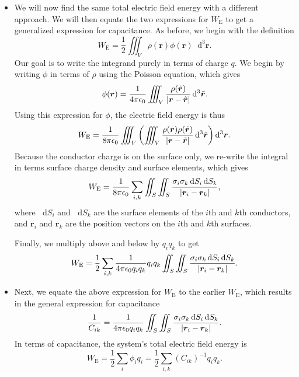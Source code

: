 \documentclass[11pt, a4paper]{article}
\newcommand{\diff}{\mathop{}\!\mathrm{d}} %
\newcommand{\dr}{\diff^{3} \r}  %
\newcommand{\dtr}{\diff^{3} \tilde{\r}}  %
\renewcommand{\vec}[1]{\bm{#1}} %
\renewcommand{\t}[1]{\tilde{#1}} %
\renewcommand{\r}{\vec{r}}
\newcommand{\ee}{\epsilon_{0}}  %
\begin{document}
\begin{itemize}
	\item We will now find the same total electric field energy with a different approach. We will then equate the two expressions for $ W_{\text{E}} $ to get a generalized expression for capacitance. As before, we begin with the definition
	\begin{equation*}
		W_{\text{E}} = \frac{1}{2}\iiint_{V} \rho(\r) \phi(\r) \dr.
	\end{equation*}
	Our goal is to write the integrand purely in terms of charge $ q $. We begin by writing $ \phi $ in terms of $ \rho $ using the Poisson equation, which gives
	\begin{equation*}
		\phi(\r) = \frac{1}{4\pi \ee}\iiint_{V}\frac{\rho(\t{\r})}{\abs{\r - \t{\r}}} \dtr.
	\end{equation*}
    Using this expression for $ \phi $, the electric field energy is thus
	\begin{equation*}
		W_{\text{E}} = \frac{1}{8\pi \ee} \iiint_{V}\left(\iiint_{V} \frac{\rho(\r)\rho(\t{\r})}{\abs{\r - \t{\r}}}\dtr \right) \dr.
	\end{equation*}
	Because the conductor charge is on the surface only, we re-write the integral in terms surface charge density and surface elements, which gives
	\begin{equation*}
		W_{\text{E}} = \frac{1}{8\pi \ee}\sum_{i, k} \iint_{S} \iint_{S} \frac{\sigma_{i}\sigma_{k}\diff S_{i}\diff S_{k}}{\abs{\r_{i} - \r_{k}}},
	\end{equation*}
	where $ \diff S_{i} $ and $ \diff S_{k} $ are the surface elements of the $ i $th and $ k $th conductors, and $ \r_{i} $ and $ \r_{k} $ are the position vectors on the $ i $th and $ k $th surfaces. 
	
	Finally, we multiply above and below by $ q_{i}q_{k} $ to get
	\begin{equation*}
		W_{\text{E}} = \frac{1}{2} \sum_{i, k} \frac{1}{4\pi \ee q_{i}q_{k}}q_{i}q_{k} \iint_{S} \iint_{S} \frac{\sigma_{i}\sigma_{k}\diff S_{i}\diff S_{k}}{\abs{\r_{i} - \r_{k}}}.
	\end{equation*}
	
	\item Next, we equate the above expression for $ W_{\text{E}} $ to the earlier $ W_{\text{E}} $, which results in the general expression for capacitance
	\begin{equation*}
		\frac{1}{C_{ik}} = \frac{1}{4\pi \ee q_{i} q_{k}} \iint_{S} \iint_{S} \frac{\sigma_{i}\sigma_{k}\diff S_{i}\diff S_{k}}{\abs{\r_{i} - \r_{k}}}.
	\end{equation*}
	In terms of capacitance, the system's total electric field energy is
	\begin{equation*}
		W_{\text{E}} = \frac{1}{2}\sum_{i}\phi_{i}q_{i} = \frac{1}{2}\sum_{i, k}(C_{ik})^{-1}q_{i}q_{k}.
	\end{equation*}


\end{itemize}
\end{document}
